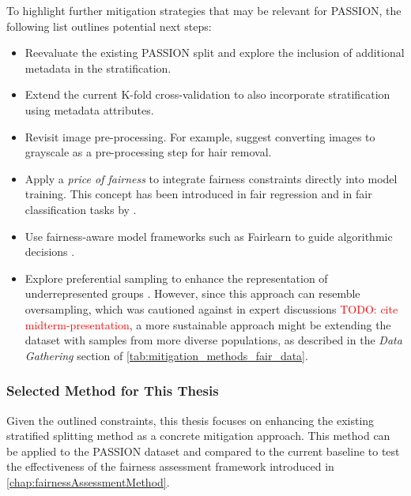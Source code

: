 \documentclass[12pt, a4paper, oneside]{book}   	%
\renewcommand{\todo}[1]{\textcolor{red}{TODO: #1}}
\renewcommand{\paragraph}[1]{%
	\subsubsection*{#1}%
}
\begin{document}
		To highlight further mitigation strategies that may be relevant for PASSION, the following list outlines potential next steps:
		\begin{itemize}
			\item Reevaluate the existing PASSION split and explore the inclusion of additional metadata in the stratification.
			
			\item Extend the current K-fold cross-validation to also incorporate stratification using metadata attributes.
			
			\item Revisit image pre-processing. For example, \textcite{Hameed_2020} suggest converting images to grayscale as a pre-processing step for hair removal.
			
			\item Apply a \textit{price of fairness} to integrate fairness constraints directly into model training. This concept has been introduced in fair regression \autocite{M14_} and in fair classification tasks by \textcite{M12_}.
			
			\item Use fairness-aware model frameworks such as \gls{Fairlearn} to guide algorithmic decisions \autocite{M155_}.
			
			\item Explore preferential sampling to enhance the representation of underrepresented groups \autocite{M75_}. However, since this approach can resemble oversampling, which was cautioned against in expert discussions \todo{cite midterm-presentation}, a more sustainable approach might be extending the dataset with samples from more diverse populations, as described in the \textit{Data Gathering} section of \autoref{tab:mitigation_methods_fair_data}.
		\end{itemize}
		
		
		
		\paragraph{Selected Method for This Thesis}
		
		Given the outlined constraints, this thesis focuses on enhancing the existing stratified splitting method as a concrete mitigation approach. This method can be applied to the PASSION dataset and compared to the current baseline to test the effectiveness of the fairness assessment framework introduced in \autoref{chap:fairnessAssessmentMethod}.
		
\end{document}
